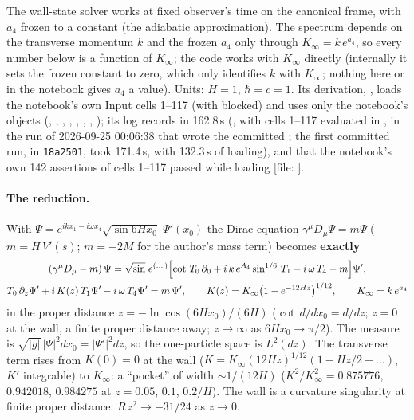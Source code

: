The wall-state solver works at fixed observer's time on the canonical frame, with $a_4$ frozen to a
constant (the adiabatic approximation). The spectrum depends on the transverse momentum $k$ and the frozen
$a_4$ only through $K_\infty=k\,e^{a_4}$, so every number below is a function of $K_\infty$; the code works
with $K_\infty$ directly (internally it sets the frozen constant to zero, which only identifies $k$ with
$K_\infty$; nothing here or in the notebook gives $a_4$ a value). Units: $H=1$, $\hbar=c=1$. Its
derivation, , loads the notebook's own Input cells
1--117 (with  blocked) and uses only the notebook's objects (,
, , , ,
, , ); its log records
 in 162.8\,s (, with cells 1--117
evaluated in , in the run of 2026-09-25 00:06:38 that wrote the committed
; the first committed run, in \texttt{18a2501}, took 171.4\,s, with 132.3\,s of
loading), and that the notebook's own 142 assertions of cells
1--117 passed while loading [file: ].

\paragraph{The reduction.} With $\Psi=e^{ikx_1-i\omega x_4}\sqrt{\sin 6Hx_0}\;\Psi'(x_0)$ the Dirac equation
$\gamma^\mu D_\mu\Psi=m\Psi$ ($m=H\,V'(s)$; $m=-2M$ for the author's mass term) becomes \textbf{exactly}
\begin{gather*}
  (\gamma^\mu D_\mu-m)\,\Psi=\sqrt{\sin}\;e^{(\dots)}\Bigl[\cot\,T_0\,\partial_0+i\,k\,e^{A_4}\sin^{1/6}\,T_1-i\,\omega\,T_4-m\Bigr]\Psi',\\
  T_0\,\partial_z\Psi'+i\,K(z)\,T_1\Psi'-i\,\omega\,T_4\Psi'=m\,\Psi',\qquad
  K(z)=K_\infty\bigl(1-e^{-12Hz}\bigr)^{1/12},\qquad K_\infty=k\,e^{a_4}
\end{gather*}
in the proper distance $z=-\ln\cos(6Hx_0)/(6H)$ ($\cot\,d/dx_0=d/dz$; $z=0$ at the wall, a finite proper
distance away; $z\to\infty$ as $6Hx_0\to\pi/2$). The measure is
$\sqrt{|g|}\,|\Psi|^2dx_0=|\Psi'|^2dz$, so the one-particle space is $L^2(dz)$. The transverse term rises
from $K(0)=0$ at the wall ($K=K_\infty(12Hz)^{1/12}(1-Hz/2+\dots)$, $K'$ integrable) to $K_\infty$: a
``pocket'' of width $\sim1/(12H)$ ($K^2/K_\infty^2=0.875776$, $0.942018$, $0.984275$ at $z=0.05$, $0.1$,
$0.2/H$). The wall is a curvature singularity at finite proper distance: $R\,z^2\to-31/24$ as $z\to0$.

